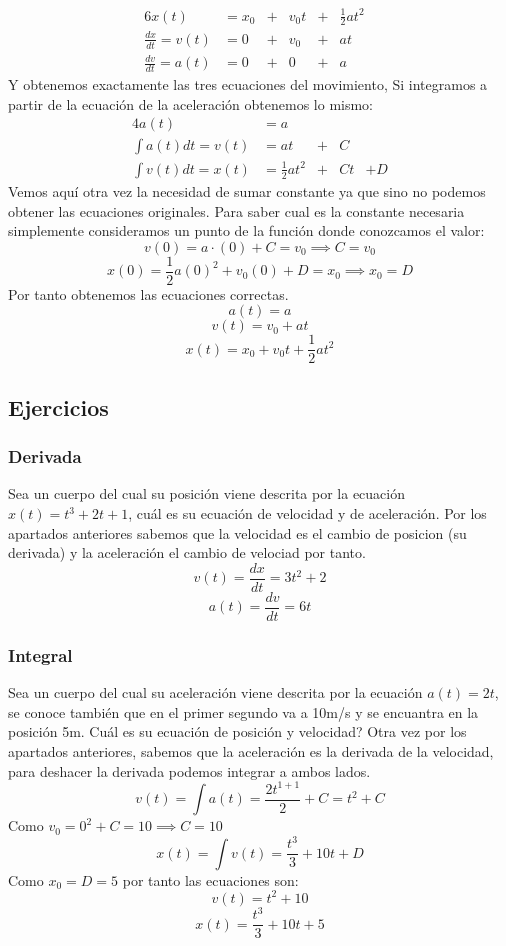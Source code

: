 \documentclass[11pt]{article}
\begin{document}
\begin{alignat*}{6}
                x(t)& = x_0& +& v_{0}t& +& \frac{1}{2}at^{2}& \\
\frac{dx}{dt} = v(t)& =   0& +& v_{0}&  +& at& \\
\frac{dv}{dt} = a(t)& =   0& +& 0&      +& a&
\end{alignat*}
Y obtenemos exactamente las tres ecuaciones del movimiento, Si integramos a partir de la ecuación de la aceleración obtenemos lo mismo:
\begin{alignat*}{4}
    a(t)& = a& \\
    \int a(t) dt = v(t)& = at& +& C& \\
    \int v(t) dt = x(t)& = \frac{1}{2}at^{2}& +& Ct& + D
\end{alignat*}
Vemos aquí otra vez la necesidad de sumar constante ya que sino no podemos obtener las ecuaciones originales.
Para saber cual es la constante necesaria simplemente consideramos un punto de la función donde conozcamos el valor:
\[
v(0) = a\cdot(0) + C = v_{0} \implies C = v_{0}
\]
\[
x(0) = \frac{1}{2}a(0)^{2} + v_{0}(0) + D = x_0 \implies x_0 = D
\]
Por tanto obtenemos las ecuaciones correctas.
\[
a(t) = a
\]
\[
v(t) = v_{0} + at
\]
\[
x(t) = x_{0} + v_{0}t + \frac{1}{2}at^{2}
\]

\subsection{Ejercicios}
\label{sec:orgd3af187}

\subsubsection{Derivada}
\label{sec:orgcd97ab1}
Sea un cuerpo del cual su posición viene descrita por la ecuación \(x(t) = t^3 + 2t + 1\), cuál es su ecuación de velocidad y de aceleración.
Por los apartados anteriores sabemos que la velocidad es el cambio de posicion (su derivada) y la aceleración el cambio de velociad por tanto.
\[
v(t) = \frac{dx}{dt} = 3t^{2} + 2
\]
\[
a(t) = \frac{dv}{dt} = 6t
\]

\subsubsection{Integral}
\label{sec:orgd053362}
    Sea un cuerpo del cual su aceleración viene descrita por la ecuación \(a(t) = 2t\), se conoce también que en el primer segundo va a 10m/s y se encuantra en la posición 5m. Cuál es su ecuación de posición y velocidad?
    Otra vez por los apartados anteriores, sabemos que la aceleración es la derivada de la velocidad, para deshacer la derivada podemos integrar a ambos lados.
\[
v(t) = \int a(t) = \frac{2t^{1+1}}{2} + C = t^{2} + C
\]
Como \(v_{0} = 0^{2} + C = 10 \implies C = 10\)
\[
x(t) = \int v(t) = \frac{t^{3}}{3} + 10t + D
\]
Como \(x_{0} = D = 5\)
por tanto las ecuaciones son:
\[
v(t) = t^{2} + 10
\]
\[
x(t) = \frac{t^{3}}{3} + 10t + 5
\]
\end{document}
